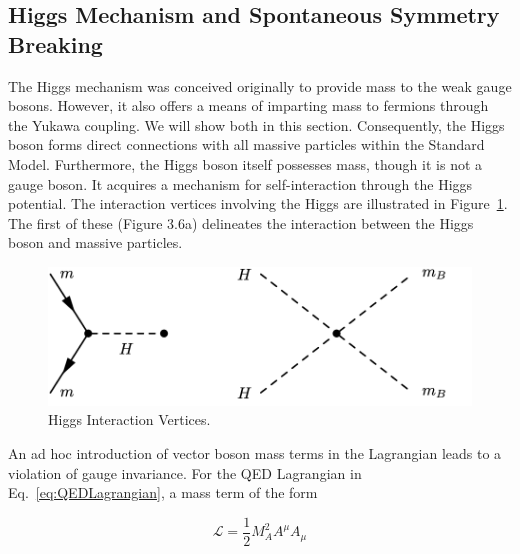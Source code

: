 
\subsection{Higgs Mechanism and Spontaneous Symmetry Breaking} \label{sec:HiggsMechanism}

The Higgs mechanism was conceived originally to provide mass to the weak gauge bosons. However, it also offers a means of imparting mass to fermions through the Yukawa coupling. We will show both in this section. Consequently, the Higgs boson forms direct connections with all massive particles within the Standard Model. Furthermore, the Higgs boson itself possesses mass, though it is not a gauge boson. It acquires a mechanism for self-interaction through the Higgs potential. The interaction vertices involving the Higgs are illustrated in Figure~\ref{fig:HiggsVertices}. The first of these (Figure 3.6a) delineates the interaction between the Higgs boson and massive particles. 

\begin{figure}[!htbp]
	\centering
     \label{fig:HiggsVertices}
    \includegraphics[scale=1.0]{fig/HiggsInteraction.png}
	\caption{Higgs Interaction Vertices.}
\end{figure}

An ad hoc introduction of vector boson mass terms in the Lagrangian leads to a violation of gauge invariance. For the QED Lagrangian in Eq.~\ref{eq:QEDLagrangian}, a mass term of the form 

\begin{equation}
    \label{eq:AmuWrongMassterm}
    \mathcal{L} = \frac{1}{2}M^2_{A}A^{\mu}A_{\mu}
\end{equation}


